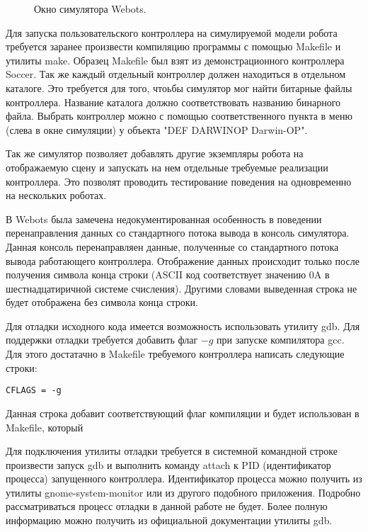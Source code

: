 \begin{figure}[h]
\caption{Окно симулятора Webots.}
\label{im:1_webots_sample_window}
\end{figure}

Для запуска пользовательского контроллера на симулируемой модели робота требуется заранее произвести компиляцию программы с помощью Makefile и утилиты make. Образец Makefile был взят из демонстрационного контроллера Soccer. Так же каждый отдельный контроллер должен находиться в отдельном каталоге. Это требуется для того, чтоьбы симулятор мог найти битарные файлы контроллера. Название каталога должно соответствовать названию бинарного файла. Выбрать контроллер можно с помощью соответственного пункта в меню (слева в окне симуляции) у объекта "DEF DARWINOP Darwin-OP".

Так же симулятор позволяет добавлять другие экземпляры робота на отображаемую сцену и запускать на нем отдельные требуемые реализации контроллера. Это позволят проводить тестирование поведения на одновременно на нескольких роботах.

В Webots была замечена недокументированная особенность в поведении перенаправления данных со стандартного потока вывода в консоль симулятора. Данная консоль перенаправляен данные, полученные со стандартного потока вывода работающего контроллера. Отображение данных происходит только после получения символа конца строки (ASCII код соответствует значению 0A в шестнадцатиричной системе счисления). Другими словами выведенная строка не будет отображена без символа конца строки.

Для отладки исходного кода имеется возможность использовать утилиту gdb. Для поддержки отладки требуется добавить флаг $-g$ при запуске компилятора gcc. Для этого достатачно в Makefile требуемого контроллера написать следующие строки:

\lstset{language=[gnu] make}
\begin{lstlisting}
CFLAGS = -g
\end{lstlisting}

Данная строка добавит соответствующий флаг компиляции и будет использован в Makefile, который 

Для подключения утилиты отладки требуется в системной командной строке произвести запуск gdb и выполнить команду attach к PID (идентификатор процесса) запущенного контроллера. Идентификатор процесса можно получить из утилиты gnome-system-monitor или из другого подобного приложения. Подробно рассматриваться процесс отладки в данной работе не будет. Более полную информацию можно получить из официальной документации утилиты gdb.

